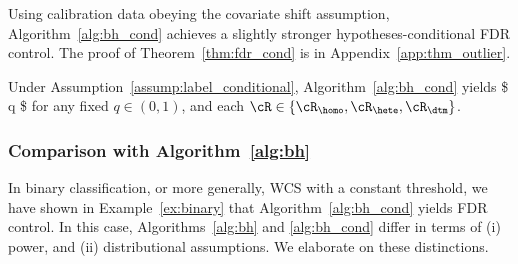Using calibration data obeying the covariate shift assumption, Algorithm~\ref{alg:bh_cond} achieves
a slightly stronger  hypotheses-conditional FDR control.
The proof of Theorem~\ref{thm:fdr_cond} is in Appendix~\ref{app:thm_outlier}.
\begin{theorem}\label{thm:fdr_cond}
  Under Assumption~\ref{assump:label_conditional}, Algorithm~\ref{alg:bh_cond} yields
  \$
\EE{}   \leq q\cdot {}
\$
for any fixed $q\in(0,1)$, and each  $\cR \in \{\cR_{\homo},\cR_{\hete}, \cR_{\dtm}\}$.
\end{theorem}


\subsubsection{Comparison with Algorithm~\ref{alg:bh}}
\label{subsubsec:compare}

In binary classification, or more generally,
WCS with a constant threshold,
we have shown in Example~\ref{ex:binary} that
Algorithm~\ref{alg:bh_cond} yields FDR control.
In this case, Algorithms~\ref{alg:bh} and \ref{alg:bh_cond} differ
in terms of (i) power, and (ii) distributional assumptions.
We elaborate on these distinctions.


